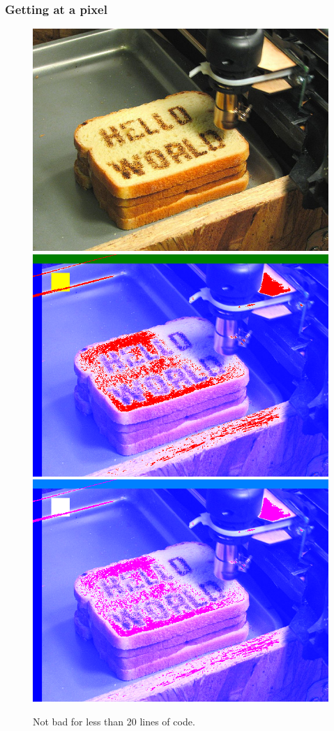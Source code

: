 \documentclass{beamer}
\begin{document}
\begin{frame}
\frametitle{Getting at a pixel}
 \begin{figure}
     \includegraphics[width=0.3\linewidth]{helloworld.jpg}
     \quad
     \includegraphics[width=0.3\linewidth]{ColorToast.png}
     \quad
     \includegraphics[width=0.3\linewidth]{ColorToast2.png}
     \caption{Not bad for less than 20 lines of code.}
 \end{figure}

\end{frame}
\end{document}
